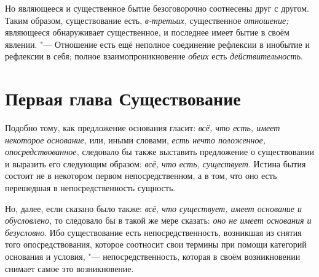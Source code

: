 Но являющееся и существенное бытие безоговорочно соотнесены друг с другом.
Таким образом, существование есть, {\em в-третьих,}
существенное {\em отношение;} являющееся обнаруживает
существенное, и последнее имеет бытие в своём явлении. "--- Отношение есть ещё
неполное соединение рефлексии в инобытие и рефлексии в себя; полное
взаимопроникновение {\em обеих} есть {\em действительность}.

\chapter[{\em Первая глава} Существование]{Первая глава Существование}

Подобно тому, как предложение основания гласит:
{\em всё, что есть, имеет некоторое основание,} или,
иными словами, {\em есть нечто положенное,
опосредствованное,} следовало бы также выставить предложение о
существовании и выразить его следующим образом:
{\em всё, что есть, существует}. Истина бытия состоит
не в некотором первом непосредственном, а в том, что оно есть перешедшая в
непосредственность сущность.

Но, далее, если сказано было также: {\em всё, что
существует, имеет основание и обусловлено,} то следовало бы в такой же мере
сказать: {\em оно не имеет основания и безусловно}. Ибо
существование есть непосредственность, возникшая из снятия того
опосредствования, которое соотносит свои термины при помощи категорий
основания и условия, "--- непосредственность, которая в своём возникновении
снимает самое это возникновение.

